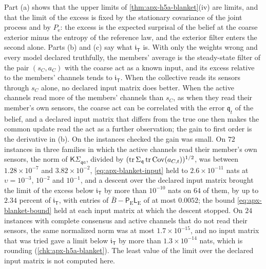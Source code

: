 Part (a) shows that the upper limits of \cref{thm:apx-h5a-blanket}(iv) are limits, and that the limit of the excess is fixed by the stationary covariance of the joint process and by $P_{\mathrm e}$: the excess is the expected surprisal of the belief at the coarse exterior minus the entropy of the reference law, and the exterior filter enters the second alone. Parts (b) and (c) say what $\mathfrak i_{\mathsf T}$ is. With only the weights wrong and every model declared truthfully, the members' average is the steady-state filter of the pair $(s_C,a_C)$ with the coarse act as a known input, and its excess relative to the members' channels tends to $\mathfrak i_{\mathsf T}$. When the collective reads its sensors through $s_C$ alone, no declared input matrix does better. When the active channels read more of the members' channels than $s_C$, as when they read their member's own sensors, the coarse act can be correlated with the error $\mathfrak q_t$ of the belief, and a declared input matrix that differs from the true one then makes the common update read the act as a further observation; the gain to first order is the derivative in (b). On the instances checked the gain was small. On $72$ instances in three families in which the active channels read their member's own sensors, the norm of $\mathsf K\Sigma_{\mathfrak qa}$, divided by $(\operatorname{tr}\Sigma_{\mathfrak q}\operatorname{tr}\operatorname{Cov}(a_{C,t}))^{1/2}$, was between $1.28\times10^{-7}$ and $3.82\times10^{-2}$, \eqref{eq:apx-blanket-input} held to $2.6\times10^{-11}$ nats at $\upsilon=10^{-3}$, $10^{-2}$ and $10^{-1}$, and a descent over the declared input matrix brought the limit of the excess below $\mathfrak i_{\mathsf T}$ by more than $10^{-10}$ nats on $64$ of them, by up to $2.34$ percent of $\mathfrak i_{\mathsf T}$, with entries of $\bar B-\mathsf P_{\mathrm E}\mathsf L_{\mathrm E}$ of at most $0.0052$; the bound \eqref{eq:apx-blanket-bound} held at each input matrix at which the descent stopped. On $24$ instances with complete consensus and active channels that do not read their sensors, the same normalized norm was at most $1.7\times10^{-15}$, and no input matrix that was tried gave a limit below $\mathfrak i_{\mathsf T}$ by more than $1.3\times10^{-14}$ nats, which is rounding (\cref{chk:apx-h5a-blanket}). The least value of the limit over the declared input matrix is not computed here.

